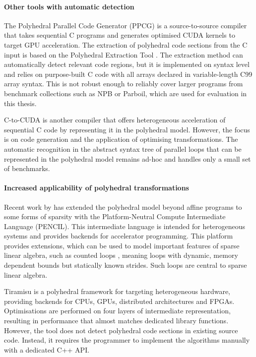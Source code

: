     \paragraph*{Other tools with automatic detection}
    The Polyhedral Parallel Code Generator (PPCG)
    \citep{Verdoolaege:2013:PPC:2400682.2400713} is a source-to-source compiler
    that takes sequential C programs and generates optimised CUDA kernels to
    target GPU acceleration.
    The extraction of polyhedral code sections from the C input is based on the
    Polyhedral Extraction Tool \citep{Verdoolaege12polyhedralextraction}.
    The extraction method can automatically detect relevant code regions, but it
    is implemented on syntax level and relies on purpose-built C code with all
    arrays declared in variable-length C99 array syntax.
    This is not robust enough to reliably cover larger programs from benchmark
    collections such as NPB or Parboil, which are used for evaluation in this
    thesis.

    C-to-CUDA \citep{Baskaran:2010:ACC:2175462.2175482} is another compiler that
    offers heterogeneous acceleration of sequential C code by representing it in
    the polyhedral model.
    However, the focus is on code generation and the application of optimising
    transformations.
    The automatic recognition in the abstract syntax tree of parallel loops that
    can be represented in the polyhedral model remains ad-hoc and handles only a
    small set of benchmarks.

    \paragraph*{Increased applicability of polyhedral transformations}
    Recent work by \citet{baghdadi2015PENCIL} has extended the polyhedral model
    beyond affine programs to some forms of sparsity with the
    Platform-Neutral Compute Intermediate Language (PENCIL).
    This intermediate language is intended for heterogeneous systems and
    provides backends for accelerator programming.
    This platform provides extensions, which can be used to model important
    features of sparse linear algebra, such as counted loops
    \citep{Zhao:2018:PCF:3178372.3179509}, meaning loops with dynamic, memory
    dependent bounds but statically known strides.
    Such loops are central to sparse linear algebra.

    Tiramisu \citep{Baghdadi:2019:TPC:3314872.3314896} is a polyhedral framework
    for targeting heterogeneous hardware, providing backends for CPUs, GPUs,
    distributed architectures and FPGAs.
    Optimisations are performed on four layers of intermediate representation,
    resulting in performance that almost matches dedicated library functions.
    However, the tool does not detect polyhedral code sections in existing
    source code.
    Instead, it requires the programmer to implement the algorithms manually
    with a dedicated C++ API.

